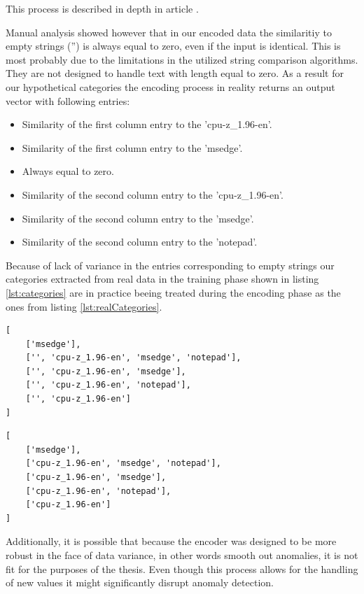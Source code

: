 \documentclass[a4paper,twoside,12pt]{book}
\begin{document}
This process is described in depth in article \cite{bib:dirtycat}.

Manual analysis showed however that in our encoded data the similaritiy to empty strings ('') is 
always equal to zero, even if the input is identical. This is most probably due to the limitations 
in the utilized string comparison algorithms. They are not designed to handle text with length equal to zero.
As a result for our hypothetical categories the encoding process in reality returns an output vector with 
following entries:
\begin{itemize}
	\item Similarity of the first column entry to the 'cpu-z\_1.96-en'.
	\item Similarity of the first column entry to the 'msedge'.
	\item Always equal to zero.
	\item Similarity of the second column entry to the 'cpu-z\_1.96-en'.
	\item Similarity of the second column entry to the 'msedge'.
	\item Similarity of the second column entry to the 'notepad'.
\end{itemize}

Because of lack of variance in the entries corresponding to empty strings our categories extracted 
from real data in the training phase shown in listing \ref{lst:categories} are in practice beeing treated 
during the encoding phase as the ones from listing \ref{lst:realCategories}.

\begin{lstlisting}[label={lst:categories},caption={Categories calculated from real split path data.}]
[
	['msedge'],
	['', 'cpu-z_1.96-en', 'msedge', 'notepad'],
 	['', 'cpu-z_1.96-en', 'msedge'],
	['', 'cpu-z_1.96-en', 'notepad'],
 	['', 'cpu-z_1.96-en']
]
\end{lstlisting}


\begin{lstlisting}[label={lst:realCategories},caption={Practical categories resulting from encoder mishandling empty strings.}]
[
	['msedge'],
	['cpu-z_1.96-en', 'msedge', 'notepad'],
	['cpu-z_1.96-en', 'msedge'],
	['cpu-z_1.96-en', 'notepad'],
	['cpu-z_1.96-en']
]
\end{lstlisting}

Additionally, it is possible that because the encoder was designed to be more robust in the face of
data variance, in other words smooth out anomalies, it is not fit for the purposes of the thesis. 
Even though this process allows for the handling of new values it might significantly disrupt anomaly detection.
\end{document}
